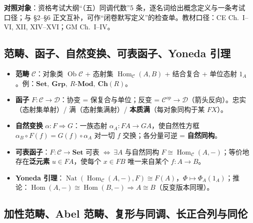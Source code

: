 \documentclass[12pt,a4paper]{ctexart}
\DeclareMathOperator{\Hom}{Hom}
\begin{document}
\textbf{对照对象}：资格考试大纲“（五）同调代数”5 条，逐名词给出概念定义与一条考试口径；与 \S2--\S6 正文互补，可作“闭卷默写定义”的检查单。教材口径：CE Ch.~I--VI, XII, XIV--XVI；GM Ch.~I--IV。

\subsection{范畴、函子、自然变换、可表函子、Yoneda 引理}

\begin{itemize}
  \item \textbf{范畴} $\mathcal C$：对象类 $\operatorname{Ob}\mathcal C$ + 态射集 $\Hom_{\mathcal C}(A,B)$ + 结合复合 + 单位态射 $1_A$。例：$\mathbf{Set},\ \mathbf{Grp},\ R\text{-}\mathbf{Mod},\ \mathbf{Ch}(R)$。
  \item \textbf{函子} $F\colon\mathcal C\to\mathcal D$：协变 = 保复合与单位；反变 = $\mathcal C^{op}\to\mathcal D$（箭头反向）。忠实（态射集单射）/ 满（态射集满射）/ \textbf{本质满}（每对象同构于某 $FX$）。
  \item \textbf{自然变换} $\alpha\colon F\Rightarrow G$：一族态射 $\alpha_A\colon FA\to GA$，使自然性方框 $\alpha_B\circ F(f)=G(f)\circ\alpha_A$ 对一切 $f$ 交换；各分量可逆 = \textbf{自然同构}。
  \item \textbf{可表函子}：$F\colon\mathcal C\to\mathbf{Set}$ 可表 $\Longleftrightarrow\ \exists A$ 与自然同构 $F\cong\Hom_{\mathcal C}(A,-)$；等价地存在\textbf{泛元素} $u\in FA$，使每个 $x\in FB$ 唯一来自某个 $f\colon A\to B$。
  \item \textbf{Yoneda 引理}：$\operatorname{Nat}(\Hom_{\mathcal C}(A,-),F)\cong F(A)$，$\Phi\mapsto\Phi_A(1_A)$；推论：$\Hom(A,-)\cong\Hom(B,-)\Rightarrow A\cong B$（反变版本同理）。
\end{itemize}

\subsection{加性范畴、Abel 范畴、复形与同调、长正合列与同伦}
\end{document}
